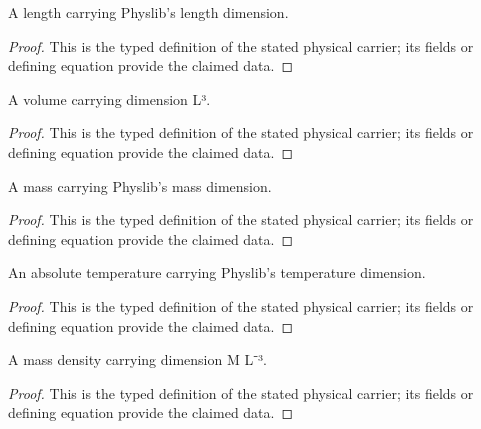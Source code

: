 \begin{definition}
  \label{def:physics:IPhO_2026_4_A_1:aux001}
  A length carrying Physlib's length dimension.
\end{definition}
\begin{proof}
  This is the typed definition of the stated physical carrier; its fields or defining equation provide the claimed data.
\end{proof}

\begin{definition}
  \label{def:physics:IPhO_2026_4_A_1:aux002}
  A volume carrying dimension L³.
\end{definition}
\begin{proof}
  This is the typed definition of the stated physical carrier; its fields or defining equation provide the claimed data.
\end{proof}

\begin{definition}
  \label{def:physics:IPhO_2026_4_A_1:aux003}
  A mass carrying Physlib's mass dimension.
\end{definition}
\begin{proof}
  This is the typed definition of the stated physical carrier; its fields or defining equation provide the claimed data.
\end{proof}

\begin{definition}
  \label{def:physics:IPhO_2026_4_A_1:aux004}
  An absolute temperature carrying Physlib's temperature dimension.
\end{definition}
\begin{proof}
  This is the typed definition of the stated physical carrier; its fields or defining equation provide the claimed data.
\end{proof}

\begin{definition}
  \label{def:physics:IPhO_2026_4_A_1:aux005}
  A mass density carrying dimension M L⁻³.
\end{definition}
\begin{proof}
  This is the typed definition of the stated physical carrier; its fields or defining equation provide the claimed data.
\end{proof}


